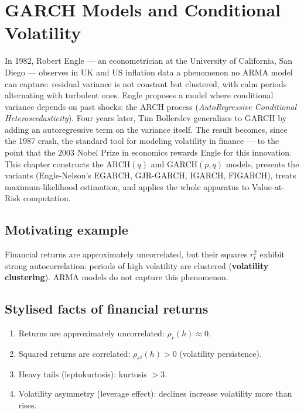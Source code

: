 \chapter{GARCH Models and Conditional Volatility}
\label{ch:garch}

In 1982, Robert Engle --- an econometrician at the University of California, San Diego --- observes in UK and US inflation data a phenomenon no ARMA model can capture: residual variance is not constant but clustered, with calm periods alternating with turbulent ones. Engle proposes a model where conditional variance depends on past shocks: the ARCH process (\emph{AutoRegressive Conditional Heteroscedasticity}). Four years later, Tim Bollerslev generalizes to GARCH by adding an autoregressive term on the variance itself. The result becomes, since the 1987 crash, the standard tool for modeling volatility in finance --- to the point that the 2003 Nobel Prize in economics rewards Engle for this innovation. This chapter constructs the ARCH$(q)$ and GARCH$(p,q)$ models, presents the variants (Engle-Nelson's EGARCH, GJR-GARCH, IGARCH, FIGARCH), treats maximum-likelihood estimation, and applies the whole apparatus to Value-at-Risk computation.

\section{Motivating example}
Financial returns are approximately uncorrelated, but their squares $r_t^2$ exhibit strong autocorrelation: periods of high volatility are clustered (\textbf{volatility clustering}). ARMA models do not capture this phenomenon.

\section{Stylised facts of financial returns}

\begin{enumerate}
\item Returns are approximately uncorrelated: $\rho_{r}(h)\approx 0$.
\item Squared returns are correlated: $\rho_{r^2}(h)>0$ (volatility persistence).
\item Heavy tails (leptokurtosis): kurtosis $>3$.
\item Volatility asymmetry (leverage effect): declines increase volatility more than rises.
\end{enumerate}

